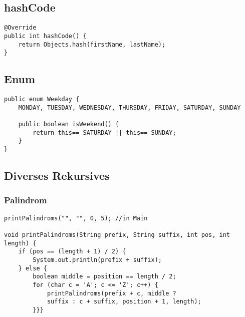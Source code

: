 \begin{multicols*}{5}
	\subsection{hashCode}
		\begin{lstlisting}
@Override
public int hashCode() {
	return Objects.hash(firstName, lastName);
}
		\end{lstlisting}
	
	
	\subsection{Enum}
	\begin{lstlisting}
public enum Weekday {
	MONDAY, TUESDAY, WEDNESDAY, THURSDAY, FRIDAY, SATURDAY, SUNDAY 
	
	public boolean isWeekend() {
		return this== SATURDAY || this== SUNDAY;
	}
}
	\end{lstlisting}


	
	\subsection{Diverses Rekursives}
	\subsubsection{Palindrom}
	\begin{lstlisting}
printPalindroms("", "", 0, 5); //in Main

void printPalindroms(String prefix, String suffix, int pos, int length) {
	if (pos == (length + 1) / 2) {
		System.out.println(prefix + suffix);
	} else {
		boolean middle = position == length / 2;
		for (char c = 'A'; c <= 'Z'; c++) {
			printPalindroms(prefix + c, middle ? 
			suffix : c + suffix, position + 1, length);
		}}}
	\end{lstlisting}

\end{multicols*}

% 

